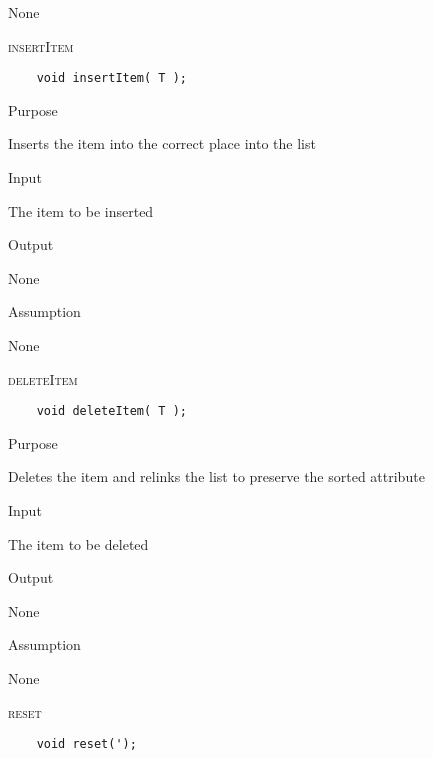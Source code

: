 \documentclass[pdftex, 11pt]{article}
\begin{document}
\begin{description}
\begin{description}
				None

		\end{description}

	\item{\textsc{insertItem}}
\begin{lstlisting}
	void insertItem( T );
\end{lstlisting}

		\begin{description}

			\item{Purpose}

				Inserts the item into the correct place into the list

			\item{Input}

				The item to be inserted

			\item{Output}

				None

			\item{Assumption}

				None

		\end{description}

	\item{\textsc{deleteItem}}
\begin{lstlisting}
	void deleteItem( T );
\end{lstlisting}

		\begin{description}

			\item{Purpose}

				Deletes the item and relinks the list to preserve the sorted attribute

			\item{Input}

				The item to be deleted

			\item{Output}

				None

			\item{Assumption}

				None

		\end{description}

	\item{\textsc{reset}}
\begin{lstlisting}
	void reset(');
\end{lstlisting}


\end{description}
\end{document}
